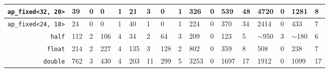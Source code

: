 \begin{landscape}
\begin{table}[H]
\begin{tabular}{|r|l|l|l|l||l|l|l|l||l|l|l|l||l|l|l|l|}
\texttt{ap\_fixed\textless{}32, 20\textgreater{}} & 39                       & 0                        & 0                       & 1                             & 21                       & 3                        & 0                       & 1                            & 326                      & 0                        & 539                     & 48                           & 4720                     & 0                        & 1281                    & 8                            \\ \hline
\texttt{ap\_fixed\textless{}24, 18\textgreater{}} & 24                       & 0                        & 0                       & 1                             & 40                       & 1                        & 0                       & 1                            & 224                      & 0                        & 370                     & 34                           & 2414                     & 0                        & 433                     & 7                            \\ \hline
\texttt{half}                                     & 112                      & 2                        & 106                     & 4                             & 34                       & 2                        & 64                      & 3                            & 209                      & 0                        & 123                     & 5                            & $\sim$950                & 3                        & $\sim$180               & 6                            \\ \hline
\texttt{float}                                    & 214                      & 2                        & 227                     & 4                             & 135                      & 3                        & 128                     & 2                            & 802                      & 0                        & 359                     & 8                            & 508                      & 0                        & 238                     & 7                            \\ \hline
\texttt{double}                                   & 762                      & 3                        & 430                     & 4                             & 203                      & 11                       & 299                     & 5                            & 3253                     & 0                        & 1697                    & 17                           & 1912                     & 0                        & 1099                    & 17                           \\ \hline
\end{tabular}
\label{ch3:tab:type_area_time}
\end{table}

\end{landscape}

